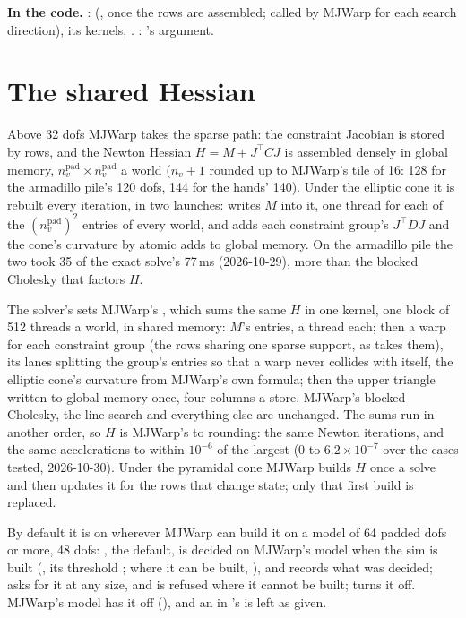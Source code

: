 \begin{codebox}
\textbf{In the code.} :  (, once the rows are assembled; called by MJWarp for each search direction), its kernels, . : 's  argument.
\end{codebox}

\section{The shared Hessian}\label{sec:sharedhessian}

Above 32 dofs MJWarp takes the sparse path: the constraint Jacobian is stored by rows, and the Newton Hessian $H = M + J^\top C J$ is assembled densely in global memory, $n_v^{\mathrm{pad}} \times n_v^{\mathrm{pad}}$ a world ($n_v + 1$ rounded up to MJWarp's tile of 16: 128 for the armadillo pile's 120 dofs, 144 for the hands' 140). Under the elliptic cone it is rebuilt every iteration, in two launches:  writes $M$ into it, one thread for each of the $(n_v^{\mathrm{pad}})^2$ entries of every world, and  adds each constraint group's $J^\top D J$ and the cone's curvature by atomic adds to global memory. On the armadillo pile the two took 35 of the exact solve's 77\,ms (2026-10-29), more than the blocked Cholesky that factors $H$.

The solver's  sets MJWarp's , which sums the same $H$ in one kernel, one block of 512 threads a world, in shared memory: $M$'s entries, a thread each; then a warp for each constraint group (the rows sharing one sparse support, as  takes them), its lanes splitting the group's entries so that a warp never collides with itself, the elliptic cone's curvature from MJWarp's own formula; then the upper triangle written to global memory once, four columns a store. MJWarp's blocked Cholesky, the line search and everything else are unchanged. The sums run in another order, so $H$ is MJWarp's to rounding: the same Newton iterations, and the same accelerations to within $10^{-6}$ of the largest (0 to $6.2\times10^{-7}$ over the cases tested, 2026-10-30). Under the pyramidal cone MJWarp builds $H$ once a solve and then updates it for the rows that change state; only that first build is replaced.

By default it is on wherever MJWarp can build it on a model of 64 padded dofs or more, 48 dofs: , the default, is decided on MJWarp's model when the sim is built (, its threshold ; where it can be built, ), and  records what was decided;  asks for it at any size, and is refused where it cannot be built;  turns it off. MJWarp's model has it off (), and an  in 's  is left as given.


